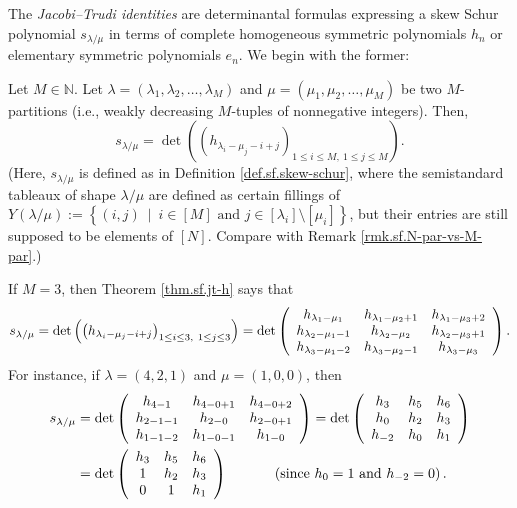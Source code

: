 The \emph{Jacobi--Trudi identities} are determinantal formulas expressing a
skew Schur polynomial $s_{\lambda/\mu}$ in terms of complete homogeneous
symmetric polynomials $h_{n}$ or elementary symmetric polynomials $e_{n}$. We
begin with the former:

\begin{theorem}
\label{thm.sf.jt-h}Let $M\in\mathbb{N}$. Let
$\lambda=\left(  \lambda_{1},\lambda_{2},\ldots,\lambda_{M}\right)  $ and
$\mu=\left(  \mu_{1},\mu_{2},\ldots,\mu_{M}\right)  $ be two $M$-partitions
(i.e., weakly decreasing $M$-tuples of nonnegative integers). Then,%
\[
s_{\lambda/\mu}=\det\left(  \left(  h_{\lambda_{i}-\mu_{j}-i+j}\right)
_{1\leq i\leq M,\ 1\leq j\leq M}\right)  .
\]
(Here, $s_{\lambda/\mu}$ is defined as in Definition \ref{def.sf.skew-schur},
where the semistandard tableaux of shape $\lambda/\mu$ are defined as certain
fillings of $Y\left(  \lambda/\mu\right)  :=\left\{  \left(  i,j\right)
\ \mid\ i\in\left[  M\right]  \text{ and }j\in\left[  \lambda_{i}\right]
\setminus\left[  \mu_{i}\right]  \right\}  $, but their entries are still
supposed to be elements of $\left[  N\right]  $. Compare with Remark
\ref{rmk.sf.N-par-vs-M-par}.)
\end{theorem}

\begin{example}
If $M=3$, then Theorem \ref{thm.sf.jt-h} says that%
\[
s_{\lambda/\mu}=\det\left(  \left(  h_{\lambda_{i}-\mu_{j}-i+j}\right)
_{1\leq i\leq3,\ 1\leq j\leq3}\right)  =\det\left(
\begin{array}
[c]{ccc}%
h_{\lambda_{1}-\mu_{1}} & h_{\lambda_{1}-\mu_{2}+1} & h_{\lambda_{1}-\mu
_{3}+2}\\
h_{\lambda_{2}-\mu_{1}-1} & h_{\lambda_{2}-\mu_{2}} & h_{\lambda_{2}-\mu
_{3}+1}\\
h_{\lambda_{3}-\mu_{1}-2} & h_{\lambda_{3}-\mu_{2}-1} & h_{\lambda_{3}-\mu
_{3}}%
\end{array}
\right)  .
\]
For instance, if $\lambda=\left(  4,2,1\right)  $ and $\mu=\left(
1,0,0\right)  $, then%
\begin{align*}
s_{\lambda/\mu}  &  =\det\left(
\begin{array}
[c]{ccc}%
h_{4-1} & h_{4-0+1} & h_{4-0+2}\\
h_{2-1-1} & h_{2-0} & h_{2-0+1}\\
h_{1-1-2} & h_{1-0-1} & h_{1-0}%
\end{array}
\right)  =\det\left(
\begin{array}
[c]{ccc}%
h_{3} & h_{5} & h_{6}\\
h_{0} & h_{2} & h_{3}\\
h_{-2} & h_{0} & h_{1}%
\end{array}
\right) \\
&  =\det\left(
\begin{array}
[c]{ccc}%
h_{3} & h_{5} & h_{6}\\
1 & h_{2} & h_{3}\\
0 & 1 & h_{1}%
\end{array}
\right)  \ \ \ \ \ \ \ \ \ \ \left(  \text{since }h_{0}=1\text{ and }%
h_{-2}=0\right)  .
\end{align*}

\end{example}

